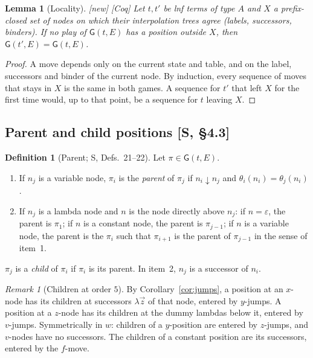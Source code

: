 \documentclass[11pt]{article}
\newcommand{\Gm}{\mathsf{G}}
\newcommand{\bnd}{\mathrel{\downarrow}}
\newcommand{\New}{\textsf{[new]}}
\newcommand{\Coq}{\textsf{[Coq]}}
\theoremstyle{plain}
\newtheorem{lemma}[theorem]{Lemma}
\theoremstyle{definition}
\newtheorem{definition}[theorem]{Definition}
\theoremstyle{remark}
\newtheorem{remark}[theorem]{Remark}
\begin{document}
\begin{lemma}[Locality]\label{lem:locality}
\New{} \Coq{} Let $t,t'$ be lnf terms of type $A$ and $X$ a
prefix-closed set of nodes on which their interpolation trees agree
(labels, successors, binders).  If no play of $\Gm(t,E)$ has a position
outside $X$, then $\Gm(t',E)=\Gm(t,E)$.
\end{lemma}
\begin{proof}
A move depends only on the current state and table, and on the label,
successors and binder of the current node.  By induction, every
sequence of moves that stays in $X$ is the same in both games.  A
sequence for $t'$ that left $X$ for the first time would, up to that
point, be a sequence for $t$ leaving $X$.
\end{proof}

\subsection{Parent and child positions [S, \S4.3]}

\begin{definition}[Parent; S, Defs.~21--22]\label{def:parent}
Let $\pi\in\Gm(t,E)$.
\begin{enumerate}
\item If $n_j$ is a variable node, $\pi_i$ is the \emph{parent} of
  $\pi_j$ if $n_i\bnd n_j$ and $\theta_i(n_i)=\theta_j(n_i)$.
\item If $n_j$ is a lambda node and $n$ is the node directly above
  $n_j$: if $n=\varepsilon$, the parent is $\pi_1$; if $n$ is a constant
  node, the parent is $\pi_{j-1}$; if $n$ is a variable node, the parent
  is the $\pi_i$ such that $\pi_{i+1}$ is the parent of $\pi_{j-1}$ in the
  sense of item~1.
\end{enumerate}
$\pi_j$ is a \emph{child} of $\pi_i$ if $\pi_i$ is its parent.  In
item~2, $n_j$ is a successor of $n_i$.
\end{definition}

\begin{remark}[Children at order $5$]
By Corollary~\ref{cor:jumps}, a position at an $x$-node has its children
at successors $\lambda\vec z$ of that node, entered by $y$-jumps.  A
position at a $z$-node has its children at the dummy lambdas below it,
entered by $v$-jumps.  Symmetrically in $w$: children of a $y$-position
are entered by $z$-jumps, and $v$-nodes have no successors.  The
children of a constant position are its successors, entered by the
$f$-move.
\end{remark}
\end{document}
